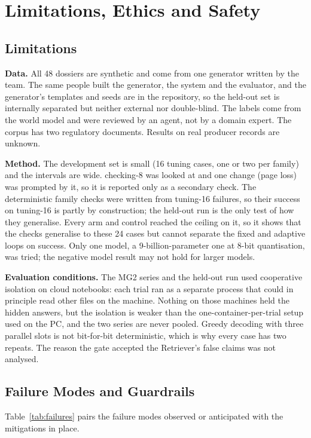 \chapter{Limitations, Ethics and Safety}

\section{Limitations}
\textbf{Data.} All 48 dossiers are synthetic and come from one generator written by the team. The
same people built the generator, the system and the evaluator, and the generator's templates and
seeds are in the repository, so the held-out set is internally separated but neither external nor
double-blind. The labels come from the world model and were reviewed by an agent, not by a domain
expert. The corpus has two regulatory documents. Results on real producer records are unknown.

\textbf{Method.} The development set is small (16 tuning cases, one or two per family) and the
intervals are wide. checking-8 was looked at and one change (page loss) was prompted by it, so it is
reported only as a secondary check. The deterministic family checks were written from tuning-16
failures, so their success on tuning-16 is partly by construction; the held-out run is the only
test of how they generalise. Every arm and control reached the ceiling on it, so it shows that the
checks generalise to these 24 cases but cannot separate the fixed and adaptive loops on success. Only one model, a 9-billion-parameter one at 8-bit quantisation, was
tried; the negative model result may not hold for larger models.

\textbf{Evaluation conditions.} The MG2 series and the held-out run used cooperative isolation on
cloud notebooks: each trial ran as a separate process that could in principle read other files on
the machine. Nothing on those machines held the hidden answers, but the isolation is weaker than the
one-container-per-trial setup used on the PC, and the two series are never pooled. Greedy decoding
with three parallel slots is not bit-for-bit deterministic, which is why every case has two repeats.
The reason the gate accepted the Retriever's false claims was not analysed.

\section{Failure Modes and Guardrails}
Table~\ref{tab:failures} pairs the failure modes observed or anticipated with the mitigations in
place.

